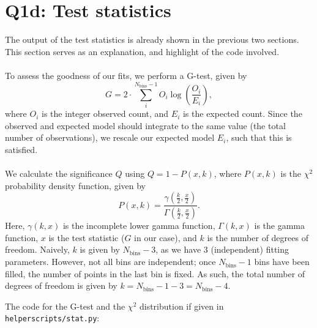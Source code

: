 \section{Q1d: Test statistics}
\label{sec:Q1d}
The output of the test statistics is already shown in the previous two sections. This section serves as an explanation, and highlight of the code involved.\\
\\
To assess the goodness of our fits, we perform a G-test, given by
\begin{equation}
    G = 2\cdot\sum_i^{N_\text{bins}-1}O_i\log\left(\frac{O_i}{E_i}\right),
\end{equation}
where $O_i$ is the integer observed count, and $E_i$ is the expected count. Since the observed and expected model should integrate to the same value (the total number of observations), we rescale our expected model $E_i$, such that this is satisfied.\\
\\
We calculate the significance $Q$ using $Q=1-P(x, k)$, where $P(x,k)$ is the $\chi^2$ probability density function, given by
\begin{equation}
    P(x,k) = \frac{\gamma\left(\frac{k}{2}, \frac{x}{2}\right)}{\Gamma\left(\frac{k}{2}, \frac{x}{2}\right)}.
\end{equation}
Here, $\gamma(k, x)$ is the incomplete lower gamma function, $\Gamma(k, x)$ is the gamma function, $x$ is the test statistic ($G$ in our case), and $k$ is the number of degrees of freedom. Naively, $k$ is given by $N_\text{bins} - 3$, as we have 3 (independent) fitting parameters. However, not all bins are independent; once $N_\text{bins}-1$ bins have been filled, the number of points in the last bin is fixed. As such, the total number of degrees of freedom is given by $k=N_\text{bins}-1-3 = N_\text{bins}-4$.

The code for the G-test and the $\chi^2$ distribution if given in \verb|helperscripts/stat.py|:

